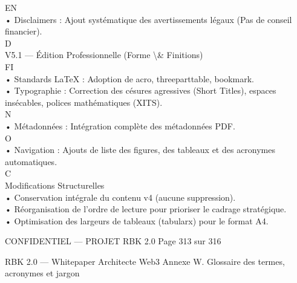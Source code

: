 \vspace{0.5em}
\vspace{0.5em}
\vspace{0.5em}
EN\\
• Disclaimers : Ajout systématique des avertissements légaux (Pas de conseil financier).\\
\vspace{0.5em}
\vspace{0.5em}
\vspace{0.5em}
\vspace{0.5em}
D\\
V5.1 — Édition Professionnelle (Forme \textbackslash{}& Finitions)\\
\vspace{0.5em}
\vspace{0.5em}
FI\\
• Standards LaTeX : Adoption de acro, threeparttable, bookmark.\\
• Typographie : Correction des césures agressives (Short Titles), espaces insécables, polices mathématiques (XITS).\\
N\\
• Métadonnées : Intégration complète des métadonnées PDF.\\
O\\
• Navigation : Ajouts de liste des figures, des tableaux et des acronymes automatiques.\\
C\\
\vspace{0.5em}
\vspace{0.5em}
Modifications Structurelles\\
• Conservation intégrale du contenu v4 (aucune suppression).\\
• Réorganisation de l’ordre de lecture pour prioriser le cadrage stratégique.\\
• Optimisation des largeurs de tableaux (tabularx) pour le format A4.\\
\vspace{0.5em}
\vspace{0.5em}
\vspace{0.5em}
\vspace{0.5em}
\begin{confidential}CONFIDENTIEL — PROJET RBK 2.0                                            Page 313 sur 316\end{confidential}
RBK 2.0 — Whitepaper Architecte Web3                                                    Annexe W. Glossaire des termes, acronymes et jargon\\
